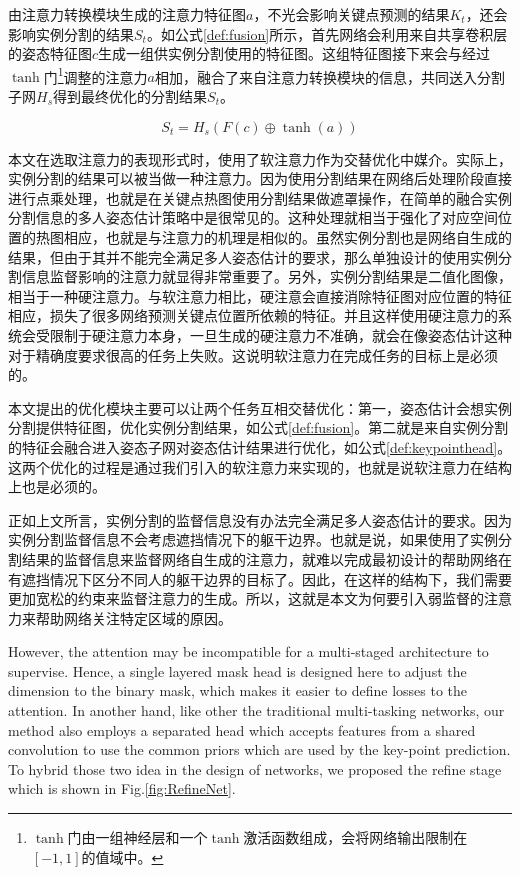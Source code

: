 由注意力转换模块生成的注意力特征图$a$，不光会影响关键点预测的结果$K_t$，还会影响实例分割的结果$S_t$。如公式\eqref{def:fusion}所示，首先网络会利用来自共享卷积层的姿态特征图$c$生成一组供实例分割使用的特征图。这组特征图接下来会与经过$\tanh$门\footnote{$\tanh$门由一组神经层和一个$\tanh$激活函数组成，会将网络输出限制在$[-1, 1]$的值域中。}调整的注意力$a$相加，融合了来自注意力转换模块的信息，共同送入分割子网$H_s$得到最终优化的分割结果$S_t$。

\begin{equation}
\label{def:fusion}
S_t = H_s(F(c) \oplus \tanh(a))
\end{equation}

本文在选取注意力的表现形式时，使用了软注意力作为交替优化中媒介。实际上，实例分割的结果可以被当做一种注意力。因为使用分割结果在网络后处理阶段直接进行点乘处理，也就是在关键点热图使用分割结果做遮罩操作，在简单的融合实例分割信息的多人姿态估计策略中是很常见的。这种处理就相当于强化了对应空间位置的热图相应，也就是与注意力的机理是相似的。虽然实例分割也是网络自生成的结果，但由于其并不能完全满足多人姿态估计的要求，那么单独设计的使用实例分割信息监督影响的注意力就显得非常重要了。另外，实例分割结果是二值化图像，相当于一种硬注意力。与软注意力相比，硬注意会直接消除特征图对应位置的特征相应，损失了很多网络预测关键点位置所依赖的特征。并且这样使用硬注意力的系统会受限制于硬注意力本身，一旦生成的硬注意力不准确，就会在像姿态估计这种对于精确度要求很高的任务上失败。这说明软注意力在完成任务的目标上是必须的。

本文提出的优化模块主要可以让两个任务互相交替优化：第一，姿态估计会想实例分割提供特征图，优化实例分割结果，如公式\eqref{def:fusion}。第二就是来自实例分割的特征会融合进入姿态子网对姿态估计结果进行优化，如公式\eqref{def:keypointhead}。这两个优化的过程是通过我们引入的软注意力来实现的，也就是说软注意力在结构上也是必须的。

正如上文所言，实例分割的监督信息没有办法完全满足多人姿态估计的要求。因为实例分割监督信息不会考虑遮挡情况下的躯干边界。也就是说，如果使用了实例分割结果的监督信息来监督网络自生成的注意力，就难以完成最初设计的帮助网络在有遮挡情况下区分不同人的躯干边界的目标了。因此，在这样的结构下，我们需要更加宽松的约束来监督注意力的生成。所以，这就是本文为何要引入弱监督的注意力来帮助网络关注特定区域的原因。

However, the attention may be incompatible for a multi-staged architecture to supervise. Hence, a single layered mask head is designed here to adjust the dimension to the binary mask, which makes it easier to define losses to the attention. In another hand, like other the traditional multi-tasking networks, our method also employs a separated head which accepts features from a shared convolution to use the common priors which are used by the key-point prediction. To hybrid those two idea in the design of networks, we proposed the refine stage which is shown in Fig.\ref{fig:RefineNet}.

